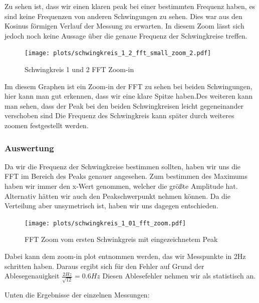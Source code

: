 \documentclass[twoside]{protokoll}
\begin{document}
Zu sehen ist, dass wir einen klaren peak bei einer bestimmten Frequenz haben, es sind keine Frequenzen von anderen Schwingungen zu sehen. 
Dies war aus den Kosinus förmigen Verlauf der Messung zu erwarten. In diesem Zoom lässt sich jedoch noch keine Aussage über die genaue Frequenz der Schwingkreise treffen.

\begin{figure}[H]
    \centering
    \texttt{[image: plots/schwingkreis\_1\_2\_fft\_small\_zoom\_2.pdf]}
    \caption{Schwingkreis 1 und 2 FFT Zoom-in}
\end{figure}

Im diesem Graphen ist ein Zoom-in der FFT zu sehen bei beiden Schwingungen, hier kann man gut erkennen, dass wir eine klare Spitze haben.Des weiteren kann man sehen, dass der Peak bei den beiden Schwingkreisen leicht gegeneinander verschoben sind 
Die Frequenz des Schwingkreis kann später durch weiteres zoomen festgestellt werden.


\subsubsection{Auswertung}
Da wir die Frequenz der Schwingkreise bestimmen sollten, haben wir uns die FFT im Bereich des Peaks genauer angesehen.
Zum bestimmen des Maximums haben wir immer den x-Wert genommen, welcher die größte Amplitude hat.
Alternativ hätten wir auch den Peakschwerpunkt nehmen können. Da die Verteilung aber unsymetrisch ist, haben wir uns dagegen entschieden.
\begin{figure}[H]
    \centering
    \texttt{[image: plots/schwingkreis\_1\_01\_fft\_zoom.pdf]}
    \caption{FFT Zoom vom ersten Schwinkgreis mit eingezeichnetem Peak}
    \label{fig:peak}
\end{figure}
Dabei kann dem zoom-in plot entnommen werden, das wir Messpunkte in 2Hz schritten haben.
Daraus ergibt sich für den Fehler auf Grund der Ablesegenauigkeit $ \frac{2Hz}{\sqrt{12}} = 0.6Hz $ 
 Diesen Ablesefehler nehmen wir als statistisch an.


Unten die Ergebnisse der einzelnen Messungen:
\end{document}
